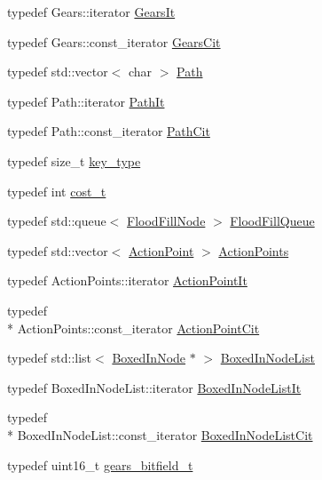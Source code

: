 \begin{DoxyCompactItemize}
\item 
typedef Gears\+::iterator \hyperlink{namespaceboxedin_a108752fd170b457fe49ff7d9ce6eafc9}{Gears\+It}
\item 
typedef Gears\+::const\+\_\+iterator \hyperlink{namespaceboxedin_ad10e1f3c9ae2e8d08f1bc2ac8c074eb7}{Gears\+Cit}
\item 
typedef std\+::vector$<$ char $>$ \hyperlink{namespaceboxedin_ab79d3e8d943aa2875e3adb42b8917ff7}{Path}
\item 
typedef Path\+::iterator \hyperlink{namespaceboxedin_a5ada570c5ebc9f728d9b0de122316173}{Path\+It}
\item 
typedef Path\+::const\+\_\+iterator \hyperlink{namespaceboxedin_ac425496c03d94f10ef5e861df766442a}{Path\+Cit}
\item 
typedef size\+\_\+t \hyperlink{namespaceboxedin_ac4dc3ff36b9cef0b4c5cc1a96bfc0abd}{key\+\_\+type}
\item 
typedef int \hyperlink{namespaceboxedin_ae2b1ff7be48e8d543a64922e65788e04}{cost\+\_\+t}
\item 
typedef std\+::queue$<$ \hyperlink{structboxedin_1_1FloodFillNode}{Flood\+Fill\+Node} $>$ \hyperlink{namespaceboxedin_a32593929ac9faf2a89b10156353111bf}{Flood\+Fill\+Queue}
\item 
typedef std\+::vector$<$ \hyperlink{structboxedin_1_1ActionPoint}{Action\+Point} $>$ \hyperlink{namespaceboxedin_ac5c79d0ac76a1a0ac73706f34abe3fc3}{Action\+Points}
\item 
typedef Action\+Points\+::iterator \hyperlink{namespaceboxedin_ad689efceb1168fa307cd39a22a6e9ad4}{Action\+Point\+It}
\item 
typedef \\*
Action\+Points\+::const\+\_\+iterator \hyperlink{namespaceboxedin_a1d095c548e50d28c4901ac9f46c8aee1}{Action\+Point\+Cit}
\item 
typedef std\+::list$<$ \hyperlink{classboxedin_1_1BoxedInNode}{Boxed\+In\+Node} $\ast$ $>$ \hyperlink{namespaceboxedin_a01412e7e38b44e8ce2d9f0d67d142219}{Boxed\+In\+Node\+List}
\item 
typedef Boxed\+In\+Node\+List\+::iterator \hyperlink{namespaceboxedin_a67fd73b97479017eac16cbd43f979636}{Boxed\+In\+Node\+List\+It}
\item 
typedef \\*
Boxed\+In\+Node\+List\+::const\+\_\+iterator \hyperlink{namespaceboxedin_a840999e14b7b86c1333d2980f406682b}{Boxed\+In\+Node\+List\+Cit}
\end{DoxyCompactItemize}
{\bf }\par
\begin{DoxyCompactItemize}
\item 
typedef uint16\+\_\+t \hyperlink{namespaceboxedin_a06d85d1dad095f12bcc1a03894abb650}{gears\+\_\+bitfield\+\_\+t}
\end{DoxyCompactItemize}

